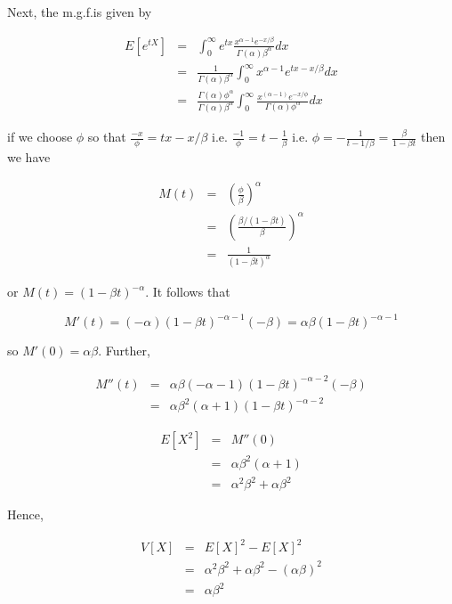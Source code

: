 \documentclass[12pt,a4paper]{article}
\theoremstyle{regla}
\theoremstyle{remark}
\theoremstyle{definition}
\theoremstyle{nonumberbreak}
\begin{document}
Next, the m.g.f.is given by 

\begin{eqnarray*}
E[e^{tX}] & = & \int_{0}^{\infty} e^{tx}  
                \frac{x^{\alpha-1}e^{-x/\beta}}
                     {\Gamma(\alpha)\beta^{\alpha}} 
                dx \\
& = & \frac{1}{\Gamma(\alpha)\beta^{\alpha}} 
\int_{0}^{\infty} x^{\alpha-1} e^{tx - x/\beta} dx \\
& = &  \frac{\Gamma(\alpha) \phi^{\alpha} }
            {\Gamma(\alpha) \beta^{\alpha}} 
\int_{0}^{\infty} \frac{x^{(\alpha-1)} e^{-x/\phi}} {\Gamma (\alpha) \phi^{\alpha}}dx 
\end{eqnarray*} 


if we choose $\phi$ so that $\frac{-x}{\phi} = tx - x/\beta$ i.e. $\frac{-1}{\phi} = t - \frac{1}{\beta}$ 
i.e. $\phi = - \frac{1}{t-1/\beta} = \frac{\beta}{1 - \beta t}$
then we have 

\begin{eqnarray*}
M(t) & = & \left(\frac{\phi}{\beta}\right)^{\alpha} \\
& = & \left(\frac{\beta / (1-\beta t)}{\beta}\right)^{\alpha} \\
& = & \frac{1}{(1-\beta t)^{\alpha} }
\end{eqnarray*} 

or $M(t) = (1-\beta t)^{-\alpha}$.
It follows that

$$ M'(t) = (-\alpha) (1-\beta t)^{-\alpha-1} (-\beta) = \alpha\beta(1-\beta t)^{-\alpha-1}$$

so $ M'(0) = \alpha\beta $. Further, 

\begin{eqnarray*}
M''(t) & = & \alpha\beta (-\alpha-1)(1-\beta t)^{-\alpha-2} (-\beta) \\
& = & \alpha\beta^2 (\alpha+1)(1-\beta t)^{-\alpha-2} 
\end{eqnarray*} 

\begin{eqnarray*}
E[X^2] & = & M''(0) \\
& = & \alpha\beta^2 (\alpha+1) \\
& = & \alpha^2 \beta^2 + \alpha \beta^2
\end{eqnarray*} 

Hence, 

\begin{eqnarray*}
V[X] & = & E[X]^2 - E[X]^2\\
& = & \alpha^2 \beta^2 + \alpha \beta^2 - (\alpha\beta)^2 \\
& = & \alpha \beta^2
\end{eqnarray*} 
\end{document}
